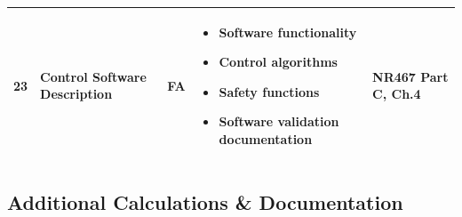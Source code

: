 \documentclass[11pt,a4paper]{report}
\newcommand{\fa}{\textbf{\textcolor{warningred}{FA}}}
\begin{document}
\begin{longtable}{|p{0.5cm}|p{5cm}|p{1.5cm}|p{5.5cm}|p{2cm}|}
23 & Control Software Description & \fa{} & 
\begin{itemize}[leftmargin=*,nosep]
\item Software functionality
\item Control algorithms
\item Safety functions
\item Software validation documentation
\end{itemize} & NR467 Part C, Ch.4 \\
\hline

\end{longtable}

\subsection{Additional Calculations \& Documentation}
\end{document}
